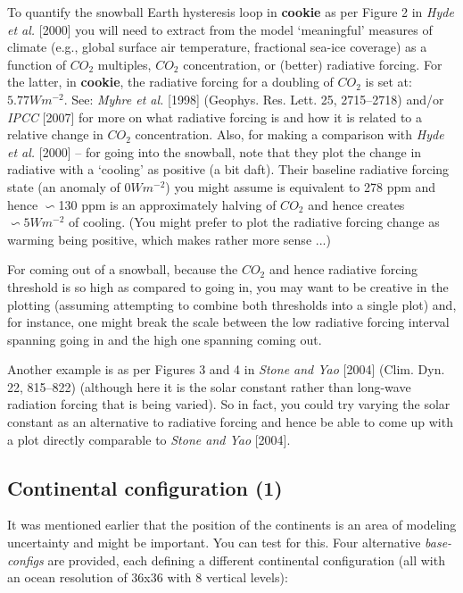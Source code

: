 To quantify the snowball Earth hysteresis loop in \textbf{cookie} as per Figure 2 in \textit{Hyde et al.} [2000] you will need to extract from the model ‘meaningful’ measures of climate (e.g., global surface air temperature, fractional sea-ice coverage) as a function of \(CO_{2}\) multiples, \(CO_{2}\) concentration, or (better) radiative forcing. For the latter, in \textbf{cookie}, the radiative forcing for a doubling of \(CO_{2}\) is set at: \(5.77 Wm^{-2}\). See: \textit{Myhre et al.} [1998] (Geophys. Res. Lett. 25, 2715–2718) and/or \textit{IPCC} [2007] for more on what radiative forcing is and how it is related to a relative change in \(CO_{2}\) concentration. Also, for making a comparison with \textit{Hyde et al.} [2000] -- for going into the snowball, note that they plot the change in radiative with a ‘cooling’ as positive (a bit daft). Their baseline radiative forcing state (an anomaly of \(0 Wm^{-2}\)) you might assume is equivalent to 278 ppm and hence \(\backsim\)130 ppm is an approximately halving of \(CO_{2}\) and hence creates \(\backsim5 Wm^{-2}\) of cooling. (You might prefer to plot the radiative forcing change as warming being positive, which makes rather more sense ...)

For coming out of a snowball, because the \(CO_{2}\) and hence radiative forcing threshold is so high as compared to going in, you may want to be creative in the plotting (assuming attempting to combine both thresholds into a single plot) and, for instance, one might break the scale between the low radiative forcing interval spanning going in and the high one spanning coming out.

Another example is as per Figures 3 and 4 in \textit{Stone and Yao} [2004] (Clim. Dyn. 22, 815–822) (although here it is the solar constant rather than long-wave radiation forcing that is being varied). So in fact, you could try varying the solar constant as an alternative to radiative forcing and hence be able to come up with a plot directly comparable to \textit{Stone and Yao} [2004].


\subsection{Continental configuration (1)}

It was mentioned earlier that the position of the continents is an area of modeling uncertainty and might be important. You can test for this. Four alternative \textit{base-configs} are provided, each defining a different continental configuration (all with an ocean resolution of 36x36 with 8 vertical levels):

